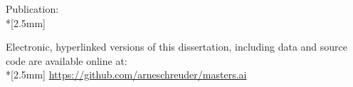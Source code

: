 \pagestyle{empty}
\vspace*{\fill}
\small

\noindent
\textsf{Publication:}\\*[2.5mm]
\textsf{
    \fontsize{9}{10pt}
    \selectfont
}
\vspace{1cm}

\noindent
\textsf{Electronic, hyperlinked versions of this dissertation, including
    data and source code are available online at:}\\*[2.5mm]
\textsf{
    \fontsize{9}{10pt}
    \selectfont
    \url{https://github.com/arneschreuder/masters.ai}
}
\newpage

